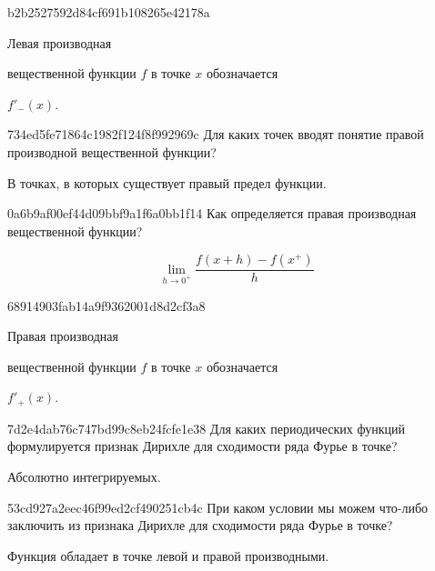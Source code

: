 \begin{note}{b2b2527592d84cf691b108265e42178a}
    \begin{icloze}{2}Левая производная\end{icloze} вещественной функции \({ f }\) в точке \({ x }\) обозначается
    \begin{icloze}{1}\({ f'_-(x) }\).\end{icloze}
\end{note}

\begin{note}{734ed5fe71864c1982f124f8f992969c}
    Для каких точек вводят понятие правой производной вещественной функции?

    \begin{cloze}{1}
        В точках, в которых существует правый предел функции.
    \end{cloze}
\end{note}

\begin{note}{0a6b9af00ef44d09bbf9a1f6a0bb1f14}
    Как определяется правая производная вещественной функции?

    \begin{cloze}{1}
        \[
           \lim_{h \to 0^{+}} \frac{f(x + h) - f(x^{+})}{h}
        \]
    \end{cloze}
\end{note}

\begin{note}{68914903fab14a9f9362001d8d2cf3a8}
    \begin{icloze}{2}Правая производная\end{icloze} вещественной функции \({ f }\) в точке \({ x }\) обозначается
    \begin{icloze}{1}\({ f'_+(x) }\).\end{icloze}
\end{note}

\begin{note}{7d2e4dab76c747bd99c8eb24fcfe1e38}
    Для каких периодических функций формулируется признак Дирихле для сходимости ряда Фурье в точке?

    \begin{cloze}{1}
        Абсолютно интегрируемых.
    \end{cloze}
\end{note}

\begin{note}{53cd927a2eec46f99ed2cf490251cb4c}
    При каком условии мы можем что-либо заключить из признака Дирихле для сходимости ряда Фурье в точке?

    \begin{cloze}{1}
        Функция обладает в точке левой и правой производными.
    \end{cloze}
\end{note}

